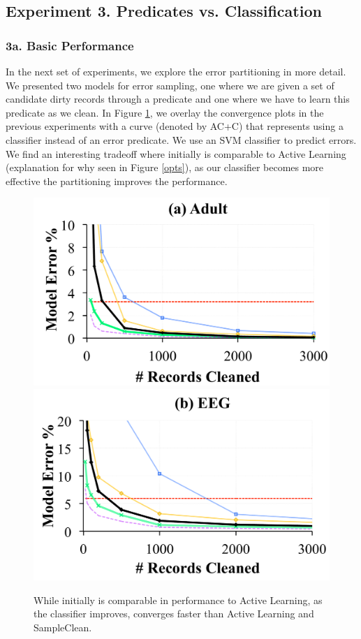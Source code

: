 \subsection{Experiment 3. Predicates vs. Classification}

\subsubsection{3a. Basic Performance}
In the next set of experiments, we explore the error partitioning in more detail.
We presented two models for error sampling, one where we are given a set of candidate dirty records through a predicate and one where we have to learn this predicate as we clean.
In Figure \ref{pred-perf}, we overlay the convergence plots in the previous experiments with a curve (denoted by AC+C) that represents \sys using a classifier instead of an error predicate.
We use an SVM classifier to predict errors.
We find an interesting tradeoff where initially \sys is comparable to Active Learning (explanation for why seen in Figure \ref{opts}), as our classifier becomes more effective the partitioning improves the performance.

\begin{figure}[t]
\centering
 \includegraphics[width=0.48\columnwidth]{exp/exp11a.pdf}
 \includegraphics[width=0.48\columnwidth]{exp/exp11b.pdf}
 \caption{While initially \sys is comparable in performance to Active Learning, as the classifier improves, \sys converges faster than Active Learning and SampleClean. \label{pred-perf}}
\end{figure}

